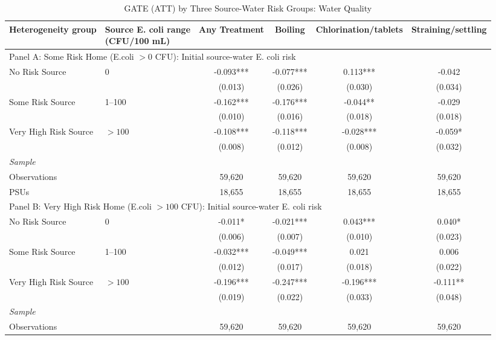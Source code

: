 \begin{landscape}
\begin{table}[p]
\centering
\caption{GATE (ATT) by Three Source-Water Risk Groups: Water Quality}
\label{tab:table_gate_main_risk_groups-ecoli}
\scriptsize\setlength{\tabcolsep}{4pt}
\begin{adjustbox}{max width=\linewidth, center}
\begin{tabular}{llcccc}
\toprule
Heterogeneity group & \shortstack{Source E. coli range\\(CFU/100 mL)} & Any Treatment & Boiling & Chlorination/tablets & Straining/settling \\
\midrule
\multicolumn{6}{l}{Panel A: Some Risk Home (E.coli $>0$ CFU): Initial source-water E. coli risk} \\
No Risk Source & 0 & -0.093*** & -0.077*** & 0.113*** & -0.042 \\
 &  & (0.013) & (0.026) & (0.030) & (0.034) \\
Some Risk Source & 1--100 & -0.162*** & -0.176*** & -0.044** & -0.029 \\
 &  & (0.010) & (0.016) & (0.018) & (0.018) \\
Very High Risk Source & $>100$ & -0.108*** & -0.118*** & -0.028*** & -0.059* \\
 &  & (0.008) & (0.012) & (0.008) & (0.032) \\
\multicolumn{6}{l}{\textit{Sample}} \\
\quad Observations &  & 59,620 & 59,620 & 59,620 & 59,620 \\
\quad PSUs &  & 18,655 & 18,655 & 18,655 & 18,655 \\
\midrule
\multicolumn{6}{l}{Panel B: Very High Risk Home (E.coli $>100$ CFU): Initial source-water E. coli risk} \\
No Risk Source & 0 & -0.011* & -0.021*** & 0.043*** & 0.040* \\
 &  & (0.006) & (0.007) & (0.010) & (0.023) \\
Some Risk Source & 1--100 & -0.032*** & -0.049*** & 0.021 & 0.006 \\
 &  & (0.012) & (0.017) & (0.018) & (0.022) \\
Very High Risk Source & $>100$ & -0.196*** & -0.247*** & -0.196*** & -0.111** \\
 &  & (0.019) & (0.022) & (0.033) & (0.048) \\
\multicolumn{6}{l}{\textit{Sample}} \\
\quad Observations &  & 59,620 & 59,620 & 59,620 & 59,620 \\

\end{tabular}
\end{adjustbox}
\end{table}
\end{landscape}
